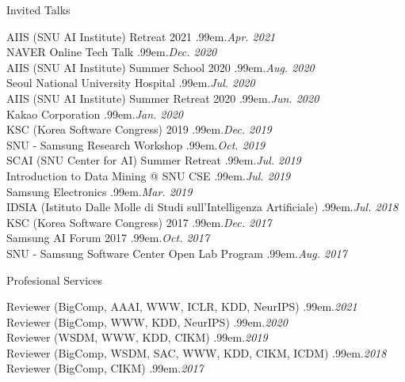 \documentclass{resume} %
\makeatletter
\newcommand \Dotfill {\leavevmode \cleaders \hb@xt@ .99em{\hss .\hss }\hfill \kern \z@}
\makeatother
\begin{document}
\begin{rSection}{Invited Talks}

AIIS (SNU AI Institute) Retreat 2021 \smallskip \Dotfill \emph{Apr. 2021} \\ 
NAVER Online Tech Talk \smallskip \Dotfill \emph{Dec. 2020} \\ 
AIIS (SNU AI Institute) Summer School 2020 \smallskip \Dotfill \emph{Aug. 2020} \\ 
Seoul National University Hospital \smallskip \Dotfill \emph{Jul. 2020} \\ 
AIIS (SNU AI Institute) Summer Retreat 2020 \smallskip \Dotfill \emph{Jun. 2020}\\ 
Kakao Corporation \smallskip \Dotfill \emph{Jan. 2020} \\ 
KSC (Korea Software Congress) 2019 \smallskip \Dotfill \emph{Dec. 2019} \\ 
SNU - Samsung Research Workshop \smallskip \Dotfill \emph{Oct. 2019} \\ 
SCAI (SNU Center for AI) Summer Retreat \smallskip \Dotfill \emph{Jul. 2019} \\ 
Introduction to Data Mining @ SNU CSE \smallskip \Dotfill \emph{Jul. 2019} \\ 
Samsung Electronics \smallskip \Dotfill \emph{Mar. 2019} \\ 
IDSIA (Istituto Dalle Molle di Studi sull'Intelligenza Artificiale) \smallskip \Dotfill \emph{Jul. 2018} \\ 
KSC (Korea Software Congress) 2017 \smallskip \Dotfill \emph{Dec. 2017} \\ 
Samsung AI Forum 2017 \smallskip \Dotfill \emph{Oct. 2017} \\ 
SNU - Samsung Software Center Open Lab Program \smallskip \Dotfill \emph{Aug. 2017}

\end{rSection}


\begin{rSection}{Profesional Services}

Reviewer (BigComp, AAAI, WWW, ICLR, KDD, NeurIPS) \smallskip \Dotfill \emph{2021} \\
Reviewer (BigComp, WWW, KDD, NeurIPS) \smallskip \Dotfill \emph{2020} \\
Reviewer (WSDM, WWW, KDD, CIKM) \smallskip \Dotfill \emph{2019} \\
Reviewer (BigComp, WSDM, SAC, WWW, KDD, CIKM, ICDM) \smallskip \Dotfill \emph{2018} \\
Reviewer (BigComp, CIKM) \smallskip \Dotfill \emph{2017}

\end{rSection}
\end{document}
